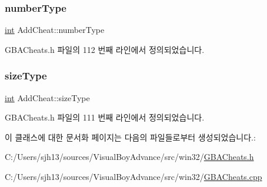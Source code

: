 \mbox{\label{class_add_cheat_a50115e7ad42a106db574754cc81bc9a0}} 
\subsubsection{\texorpdfstring{number\+Type}{numberType}}
{\footnotesize\ttfamily \mbox{\hyperlink{_util_8cpp_a0ef32aa8672df19503a49fab2d0c8071}{int}} Add\+Cheat\+::number\+Type}



G\+B\+A\+Cheats.\+h 파일의 112 번째 라인에서 정의되었습니다.

\mbox{\label{class_add_cheat_a7c3af367e51b1812d951dd2d24ac1aa8}} 
\subsubsection{\texorpdfstring{size\+Type}{sizeType}}
{\footnotesize\ttfamily \mbox{\hyperlink{_util_8cpp_a0ef32aa8672df19503a49fab2d0c8071}{int}} Add\+Cheat\+::size\+Type}



G\+B\+A\+Cheats.\+h 파일의 111 번째 라인에서 정의되었습니다.



이 클래스에 대한 문서화 페이지는 다음의 파일들로부터 생성되었습니다.\+:\begin{DoxyCompactItemize}
\item 
C\+:/\+Users/sjh13/sources/\+Visual\+Boy\+Advance/src/win32/\mbox{\hyperlink{_g_b_a_cheats_8h}{G\+B\+A\+Cheats.\+h}}\item 
C\+:/\+Users/sjh13/sources/\+Visual\+Boy\+Advance/src/win32/\mbox{\hyperlink{_g_b_a_cheats_8cpp}{G\+B\+A\+Cheats.\+cpp}}\end{DoxyCompactItemize}
